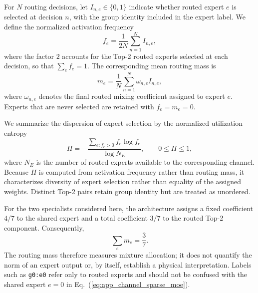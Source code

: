 \documentclass{article}
\def\plaineqref#1{\ref{#1}}
\begin{document}
For $N$ routing decisions, let $I_{n,e}\in\{0,1\}$ indicate whether routed expert $e$ is selected at decision $n$, with the group identity included in the expert label. We define the normalized activation frequency
\begin{equation}
  f_e
  =
  \frac{1}{2N}
  \sum_{n=1}^{N} I_{n,e},
  \label{eq:app_routing_frequency}
\end{equation}
where the factor $2$ accounts for the Top-2 routed experts selected at each decision, so that $\sum_e f_e=1$. The corresponding mean routing mass is
\begin{equation}
  m_e
  =
  \frac{1}{N}
  \sum_{n=1}^{N}
  \omega_{n,e}I_{n,e},
  \label{eq:app_routing_mass}
\end{equation}
where $\omega_{n,e}$ denotes the final routed mixing coefficient assigned to expert $e$. Experts that are never selected are retained with $f_e=m_e=0$.

We summarize the dispersion of expert selection by the normalized utilization entropy
\begin{equation}
  H
  =
  -\frac{
    \sum_{e:f_e>0} f_e\log f_e
  }{
    \log N_E
  },
  \qquad
  0\le H\le1,
  \label{eq:app_routing_entropy}
\end{equation}
where $N_E$ is the number of routed experts available to the corresponding channel. Because $H$ is computed from activation frequency rather than routing mass, it characterizes diversity of expert selection rather than equality of the assigned weights. Distinct Top-2 pairs retain group identity but are treated as unordered.

For the two specialists considered here, the architecture assigns a fixed coefficient $4/7$ to the shared expert and a total coefficient $3/7$ to the routed Top-2 component. Consequently,
\begin{equation}
  \sum_e m_e=\frac{3}{7}.
\end{equation}
The routing mass therefore measures mixture allocation; it does not quantify the norm of an expert output or, by itself, establish a physical interpretation.
Labels such as \texttt{g0:e0} refer only to routed experts and should not be confused with the shared expert $e=0$ in
Eq.~(\plaineqref{eq:app_channel_sparse_moe}).
\end{document}
